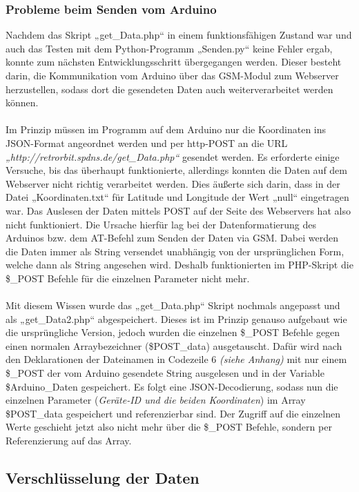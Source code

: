 \subsubsection{Probleme beim Senden vom Arduino }
Nachdem das Skript „get\_Data.php“ in einem funktionsfähigen Zustand war und auch das Testen mit dem Python-Programm „Senden.py“ keine Fehler ergab, konnte zum nächsten Entwicklungsschritt übergegangen werden. Dieser besteht darin, die Kommunikation vom Arduino über das GSM-Modul zum Webserver herzustellen, sodass dort die gesendeten Daten auch weiterverarbeitet werden können.
\\
\\
Im Prinzip müssen im Programm auf dem Arduino nur die Koordinaten ins JSON-Format angeordnet werden und per http-POST an die URL \textit{„http://retrorbit.spdns.de/get\_Data.php“} gesendet werden. Es erforderte einige Versuche, bis das überhaupt funktionierte, allerdings konnten die Daten auf dem Webserver nicht richtig verarbeitet werden. Dies äußerte sich darin, dass in der Datei „Koordinaten.txt“ für Latitude und Longitude der Wert „null“ eingetragen war. Das Auslesen der Daten mittels POST auf der Seite des Webservers hat also nicht funktioniert. Die Ursache hierfür lag bei der Datenformatierung des Arduinos bzw. dem AT-Befehl zum Senden der Daten via GSM. Dabei werden die Daten immer als String versendet unabhängig von der ursprünglichen Form, welche dann als String angesehen wird. Deshalb funktionierten im PHP-Skript die \$\_POST Befehle für die einzelnen Parameter nicht mehr.
\\
\\
Mit diesem Wissen wurde das „get\_Data.php“ Skript nochmals angepasst und als „get\_Data2.php“ abgespeichert. Dieses ist im Prinzip genauso aufgebaut wie die ursprüngliche Version, jedoch wurden die einzelnen \$\_POST Befehle gegen einen normalen Arraybezeichner (\$POST\_data) ausgetauscht. Dafür wird nach den Deklarationen der Dateinamen in Codezeile 6 \textit{(siehe Anhang)} mit nur einem  \$\_POST der vom Arduino gesendete String ausgelesen und in der Variable \$Arduino\_Daten gespeichert. Es folgt eine JSON-Decodierung, sodass nun die einzelnen Parameter (\textit{Geräte-ID und die beiden Koordinaten}) im Array \$POST\_data gespeichert und referenzierbar sind. Der Zugriff auf die einzelnen Werte geschieht jetzt also nicht mehr über die \$\_POST Befehle, sondern per Referenzierung auf das Array.

\subsection{Verschlüsselung der Daten}
